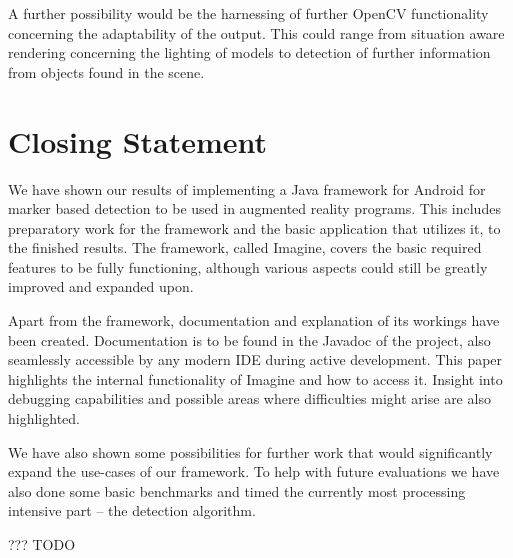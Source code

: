 A further possibility would be the harnessing of further OpenCV functionality concerning the adaptability of the output.
This could range from situation aware rendering concerning the lighting of models to detection of further information from objects found in the scene.

\section{Closing Statement}

We have shown our results of implementing a Java framework for Android for marker based detection to be used in augmented reality programs.
This includes preparatory work for the framework and the basic application that utilizes it, to the finished results.
The framework, called Imagine, covers the basic required features to be fully functioning, although various aspects could still be greatly improved and expanded upon.

Apart from the framework, documentation and explanation of its workings have been created.
Documentation is to be found in the Javadoc of the project, also seamlessly accessible by any modern IDE during active development.
This paper highlights the internal functionality of Imagine and how to access it.
Insight into debugging capabilities and possible areas where difficulties might arise are also highlighted.

We have also shown some possibilities for further work that would significantly expand the use-cases of our framework.
To help with future evaluations we have also done some basic benchmarks and timed the currently most processing intensive part – the detection algorithm.

??? TODO
